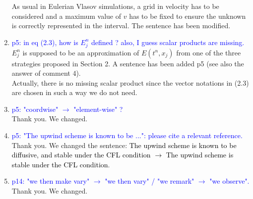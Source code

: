 \documentclass{article}
\begin{document}
\begin{enumerate}
        As usual in Eulerian Vlasov simulations, a grid in velocity has to be considered and a maximum value of $v$ has to be fixed 
        to ensure the unknown is correctly represented in the interval. The sentence has been modified. \\
        \item \textcolor{blue}{p5: in eq (2.3), how is $E^n_j$ defined ? also, I guess scalar products are missing. }\\ 
$E^n_j$ is supposed to be an approximation of $E(t^n, x_j)$ from one of the three strategies proposed in Section 2.  A sentence has been added 
p5 (see also the answer of comment 4). 
\\
Actually, there is no missing scalar product since the vector notations in (2.3) are chosen in such a way we do not need.  
\item \textcolor{blue}{p5: "coordwise" $\to$ "element-wise" ?}\\
        Thank you. We changed. 
\item \textcolor{blue}{p5: "The upwind scheme is known to be ...": please cite a relevant reference. }\\ 
      Thank you. We changed the sentence: \textcolor{black}{ The upwind scheme is known to be diffusive, and stable under the CFL condition $\to$ The upwind scheme is stable under the CFL condition}. 
\item \textcolor{blue}{p14: "we then make vary" $\to$ "we then vary" / "we remark" $\to$ "we observe". }\\
       Thank you. We changed. 
\end{enumerate}

%
%
\end{document}
